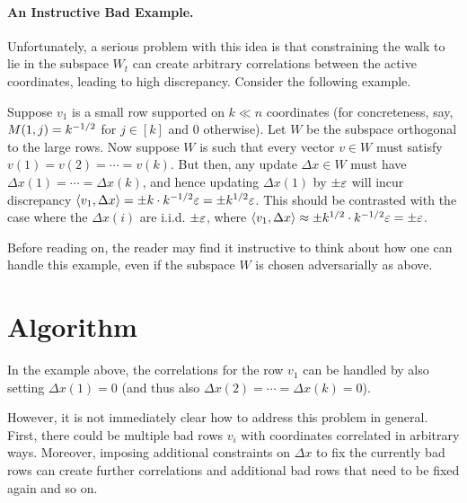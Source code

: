 
\paragraph{An Instructive Bad Example.} Unfortunately, a serious problem with this idea is that constraining the walk to lie in the subspace $W_t$ can create arbitrary correlations between the active coordinates, leading to high discrepancy.
Consider the following example.

Suppose $v_1$ is a small row supported on $k\ll n$ coordinates (for concreteness, say, $M(1,j)=k^{-1/2}$ for $j \in[k]$ and $0$ otherwise). Let $W$ be the subspace orthogonal to the large rows. Now suppose $W$ is such that every vector $v \in W$ must satisfy $v(1) = v(2) = \cdots = v(k)$. But then, any update $\Delta x \in W$ must have $\Delta x(1)= \cdots = \Delta x(k)$, and hence updating $\Delta x(1)$ by $\pm \varepsilon$ will incur discrepancy $\langle v_1, \Delta x\rangle  =\pm k \cdot k^{-1/2} \varepsilon = \pm k^{1/2} \varepsilon$. This should be contrasted with the case where the $\Delta x(i)$ are i.i.d. $\pm \varepsilon$, where $\langle v_1, \Delta x\rangle \approx \pm k^{1/2} \cdot k^{-1/2} \varepsilon = \pm \varepsilon$.

Before reading on,
the reader may find it instructive to think about how one can  handle this example, even if the subspace $W$ is chosen adversarially as above. 


\allowdisplaybreaks
\section{Algorithm}

In the example above, the correlations for the row $v_1$ can be handled by also setting $\Delta x(1)=0$ (and thus also $\Delta x(2)=\cdots =\Delta x(k) = 0$). 

However, it is not immediately clear how to address this problem in general. First, there could be multiple bad rows $v_i$ with coordinates correlated in arbitrary ways. Moreover, imposing additional constraints on $\Delta x$ to fix the currently bad rows can create further correlations and additional bad rows that need to be fixed again and so on. 


